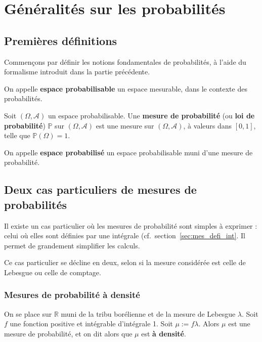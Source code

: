 \documentclass[../integ-proba.tex]{subfiles}
\begin{document}
    \chapter{Généralités sur les probabilités}

    \section{Premières définitions}

    Commençons par définir les notions fondamentales de probabilités, à l'aide du formalisme introduit dans la partie précédente.

    \begin{defi}
        On appelle \textbf{espace probabilisable} un espace mesurable, dans le contexte des probabilités.
    \end{defi}

    \begin{defi}
        Soit $\left(\Omega, \mathcal{A}\right)$ un espace probabilisable.
        Une \textbf{mesure de probabilité} (ou \textbf{loi de probabilité}) $\mathbb{P}$ sur $\left(\Omega, \mathcal{A}\right)$ est une mesure sur $\left(\Omega, \mathcal{A}\right)$, à valeurs dans $\left[0,1\right]$, telle que $\mathbb{P}\left(\Omega\right)=1$.
    \end{defi}

    \begin{defi}
        On appelle \textbf{espace probabilisé} un espace probabilisable muni d'une mesure de probabilité.
    \end{defi}

    \section{Deux cas particuliers de mesures de probabilités}
    \label{sec:probas_mes_particulieres}

    Il existe un cas particulier où les mesures de probabilité sont simples à exprimer : celui où elles sont définies par une intégrale (cf.\ section~\ref{sec:mes_defi_int}.
    Il permet de grandement simplifier les calculs.

    Ce cas particulier se décline en deux, selon si la mesure considérée est celle de Lebesgue ou celle de comptage.

        \subsection{Mesures de probabilité à densité}
            \begin{defi}
                On se place sur $\mathbb{R}$ muni de la tribu borélienne et de la mesure de Lebesgue $\lambda$.
                Soit $f$ une fonction positive et intégrable d'intégrale 1.
                Soit $\mu:=f \lambda$.
                Alors $\mu$ est une mesure de probabilité, et on dit alors que $\mu$ est \textbf{à densité}.
            \end{defi}
\end{document}
